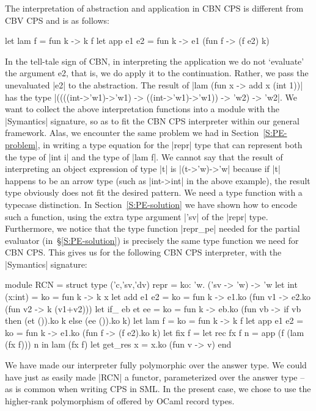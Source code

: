 \documentclass[preprint]{sigplanconf}
\begin{document}
The interpretation of abstraction and application in CBN CPS is
different from CBV CPS and is as follows:
\begin{code}
let lam f = fun k -> k f
let app e1 e2 = fun k -> e1 (fun f -> (f e2) k)
\end{code}
In the tell-tale sign of CBN, in interpreting the application
we do not `evaluate' the argument e2, that is, we do apply it to the
continuation. Rather, we pass the unevaluated |e2| to the abstraction.
The result of |lam (fun x -> add x (int 1))| has the type
|((((int->'w1)->'w1) -> ((int->'w1)->'w1)) -> 'w2) -> 'w2|.
We want to collect the above interpretation functions into a module
with the |Symantics| signature, so as to fit the CBN CPS interpreter within our
general framework. Alas, we encounter the same problem we had in
Section~\ref{S:PE-problem}, in writing a type equation for the |repr|
type that can represent both the type of |int i| and the type of 
|lam f|. We cannot say that the result of interpreting an object
expression of type |t| is |(t->'w)->'w| because if |t| happens to
be an arrow type (such as |int->int| in the above example), the result
type obviously does not fit the desired pattern. We need a type
function with a typecase distinction. In Section~\ref{S:PE-solution} we have
shown how to encode such a function, using the extra type
argument |'sv| of the |repr| type. Furthermore, we notice that the type 
function |repr_pe| needed for the partial evaluator 
(in~\S\ref{S:PE-solution}) is precisely the same type function we
need for CBN CPS. This gives us for the following CBN CPS interpreter,
with the |Symantics| signature:

\begin{code}
module RCN = struct
  type ('c,'sv,'dv) repr = 
    {ko: 'w. ('sv -> 'w) -> 'w}
  let int (x:int) = {ko = fun k -> k x}
  let add e1 e2 = 
    {ko = fun k -> e1.ko (fun v1 -> 
                   e2.ko (fun v2 -> k (v1+v2)))}
  let if_ eb et ee = 
    {ko = fun k -> eb.ko 
         (fun vb -> if vb then (et ()).ko k 
                          else (ee ()).ko k)}
  let lam f = {ko = fun k -> k f}
  let app e1 e2 = 
    {ko = fun k -> e1.ko (fun f -> (f e2).ko k)}
  let fix f = 
    let rec fx f n = app (f (lam (fx f))) n in 
    lam (fx f)
  let get_res x = x.ko (fun v -> v)
end
\end{code}

We have made our interpreter fully polymorphic over the answer type.
We could have just as easily made |RCN| a functor, parameterized over
the answer type -- as is common when writing CPS in SML. In the
present case, we chose to use the higher-rank polymorphism of offered by
OCaml record types.
\end{document}
